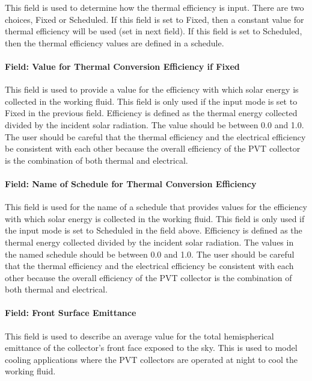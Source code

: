 This field is used to determine how the thermal efficiency is input. There are two choices, Fixed or Scheduled. If this field is set to Fixed, then a constant value for thermal efficiency will be used (set in next field). If this field is set to Scheduled, then the thermal efficiency values are defined in a schedule.

\paragraph{Field: Value for Thermal Conversion Efficiency if Fixed}\label{field-value-for-thermal-conversion-efficiency-if-fixed}

This field is used to provide a value for the efficiency with which solar energy is collected in the working fluid. This field is only used if the input mode is set to Fixed in the previous field. Efficiency is defined as the thermal energy collected divided by the incident solar radiation. The value should be between 0.0 and 1.0. The user should be careful that the thermal efficiency and the electrical efficiency be consistent with each other because the overall efficiency of the PVT collector is the combination of both thermal and electrical.

\paragraph{Field: Name of Schedule for Thermal Conversion Efficiency}\label{field-name-of-schedule-for-thermal-conversion-efficiency}

This field is used for the name of a schedule that provides values for the efficiency with which solar energy is collected in the working fluid. This field is only used if the input mode is set to Scheduled in the field above. Efficiency is defined as the thermal energy collected divided by the incident solar radiation. The values in the named schedule should be between 0.0 and 1.0. The user should be careful that the thermal efficiency and the electrical efficiency be consistent with each other because the overall efficiency of the PVT collector is the combination of both thermal and electrical.

\paragraph{Field: Front Surface Emittance}\label{field-front-surface-emittance}

This field is used to describe an average value for the total hemispherical emittance of the collector's front face exposed to the sky. This is used to model cooling applications where the PVT collectors are operated at night to cool the working fluid.

